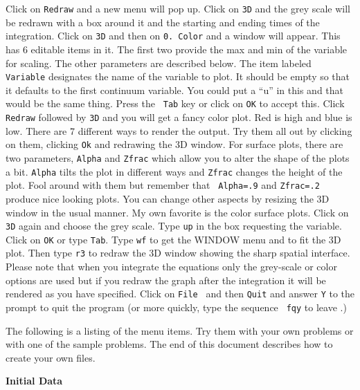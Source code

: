Click on {\tt Redraw} and a new menu will pop up. 
Click on {\tt 3D} and the grey
scale will be redrawn with a box around it and the starting and ending
times of the integration.  Click on {\tt 3D} and then on {\tt 0.
Color} and a window will appear.  This has 6 editable items in it.
The first two provide the max and min of the variable for scaling.
The other parameters are described below.  The item labeled {\tt
Variable} designates the name of the variable to plot.  It should be
empty so that it defaults to the first continuum variable.  You could
put a ``u'' in this and that would be the same thing.  Press the {\tt
Tab} key or click on {\tt OK} to accept this. Click {\tt Redraw}
followed by {\tt 3D} and you will get a fancy color plot. Red is high
and blue is low.  There are 7 different ways to render the output. Try
them all out by clicking on them, clicking {\tt Ok} and redrawing the
3D window. For surface plots, there are two parameters, {\tt Alpha}
and {\tt Zfrac} which allow you to alter the shape of the plots a bit.
{\tt Alpha} tilts the plot in different ways and {\tt Zfrac} changes
the height of the plot.  Fool around with them but remember that {\tt
Alpha=.9} and {\tt Zfrac=.2} produce nice looking plots. You can
change other aspects by resizing the 3D window in the usual manner. My
own favorite is the color surface plots.  Click on {\tt 3D} again and 
choose the grey scale. 
Type {\tt up} in the box requesting the variable.  Click on {\tt OK} or
 type {\tt Tab}.  Type {\tt wf} to get the WINDOW menu and to fit the 3D plot. 
Then type {\tt r3} to redraw the 3D window showing the sharp spatial interface.
  Please note that when you
integrate the equations only the grey-scale or color options are used
but if you redraw the graph after the integration it will be rendered
as you have specified. Click on {\tt File } and then {\tt Quit} 
 and answer {\tt Y} to the
prompt to quit the program (or more quickly, type the sequence {\tt
fqy} to leave \xtc.)  

The following is a listing of the menu items.  Try them with your own
problems or with one of the sample problems.  The end of this document
describes how to create your own \xtc files.
\vspace{.25 in}
\begin{center}
{\bf\large Initial Data }
\end{center}

